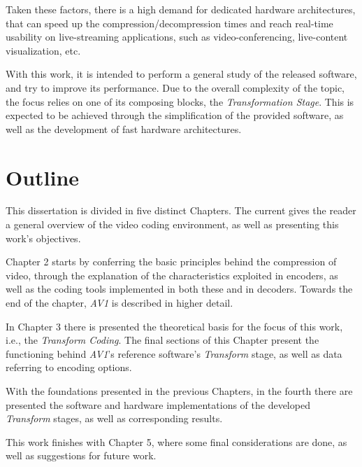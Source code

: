 Taken these factors, there is a high demand for dedicated hardware architectures, that can speed up the compression/decompression times and reach real-time usability on live-streaming applications, such as video-conferencing, live-content visualization, etc.

With this work, it is intended to perform a general study of the released software, and try to improve its performance. Due to the overall complexity of the topic, the focus relies on one of its composing blocks, the \emph{Transformation Stage}. This is expected to be achieved through the simplification of the provided software, as well as the development of fast hardware architectures.

\section{Outline}

This dissertation is divided in five distinct Chapters. The current gives the reader a general overview of the video coding environment, as well as presenting this work's objectives.

Chapter 2 starts by conferring the basic principles behind the compression of video, through the explanation of the characteristics exploited in encoders, as well as the coding tools implemented in both these and in decoders. Towards the end of the chapter, \emph{AV1} is described in higher detail.

In Chapter 3 there is presented the theoretical basis for the focus of this work, i.e., the \emph{Transform Coding}. The final sections of this Chapter present the functioning behind \emph{AV1}'s reference software's \emph{Transform} stage, as well as data referring to encoding options.

With the foundations presented in the previous Chapters, in the fourth there are presented the software and hardware implementations of the developed \emph{Transform} stages, as well as corresponding results.

This work finishes with Chapter 5, where some final considerations are done, as well as suggestions for future work.

\clearpage
\printbibliography[heading=subbibliography]
